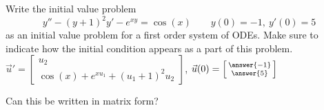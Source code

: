 \documentclass{ximera}
\begin{document}
\begin{exercise}
    Write the initial value problem 
    \[ 
        y'' - (y+1)^2 y' - e^{xy} = \cos(x) \qquad y(0) = -1,\ y'(0) = 5 
    \] 
    as an initial value problem for a first order system of ODEs. Make sure to indicate how the initial condition appears as a part of this problem.\\
    $\vec{u}' = \left[\begin{smallmatrix}  u_2 \\ \cos(x) + e^{xu_1} + (u_1 + 1)^2u_2 \end{smallmatrix}\right]$, $\vec{u}(0) = \left[\begin{smallmatrix}  \answer{-1} \\ \answer{5} \end{smallmatrix}\right]$
    \begin{problem}
        Can this be written in matrix form? %
        \begin{multipleChoice}
        \end{multipleChoice}
    \end{problem}
\end{exercise}
\end{document}
